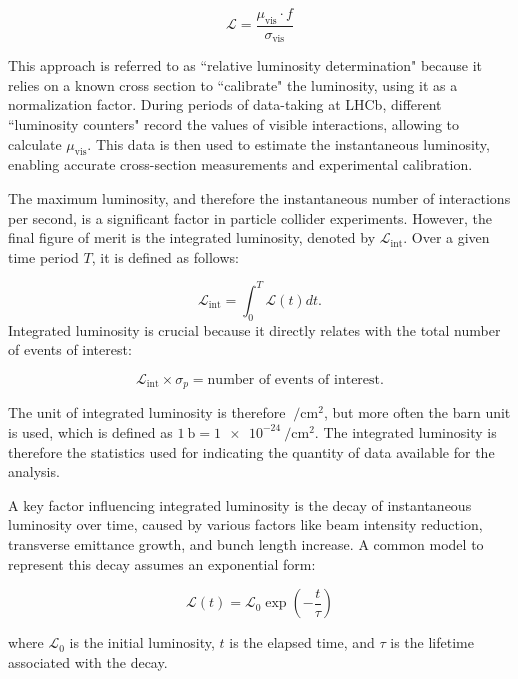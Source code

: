 \begin{equation}
\mathcal{L} = \frac{\mu_{\text{vis}} \cdot f}{\sigma_{\text{vis}}}
\end{equation}

This approach is referred to as ``relative luminosity determination" because it relies on a known cross section to ``calibrate" the luminosity, using it as a normalization factor. During periods of data-taking at LHCb, different ``luminosity counters" record the values of visible interactions, allowing to calculate $\mu_{\text{vis}}$. This data is then used to estimate the instantaneous luminosity, enabling accurate cross-section measurements and experimental calibration.


The maximum luminosity, and therefore the instantaneous number of interactions per second, is a significant factor in particle collider experiments. However, the final figure of merit is the integrated luminosity, denoted by $\mathcal{L}_{\text{int}}$. Over a given time period \(T\), it is defined as follows:

\begin{equation}
\mathcal{L}_{\text{int}} = \int_0^T \mathcal{L}(t) dt .
\end{equation}
Integrated luminosity is crucial because it directly relates with the total number of events of interest:

\begin{equation}
\mathcal{L}_{\text{int}} \times \sigma_p = \text{number of events of interest}.
\end{equation}

The unit of integrated luminosity is therefore $\SI{}{\per\centi\meter\squared}$, but more often the barn unit is used, which is defined as $\SI{1}{\barn}=\SI{1e-24}{\per\centi\meter\squared}$. The integrated luminosity is therefore the statistics used for indicating the quantity of data available for the analysis.

A key factor influencing integrated luminosity is the decay of instantaneous luminosity over time, caused by various factors like beam intensity reduction, transverse emittance growth, and bunch length increase. A common model to represent this decay assumes an exponential form:

\begin{equation}
\mathcal{L}(t) = \mathcal{L}_0 \exp\left( -\frac{t}{\tau} \right)
\end{equation}

where $\mathcal{L}_0$ is the initial luminosity, \(t\) is the elapsed time, and \(\tau\) is the lifetime associated with the decay. 

